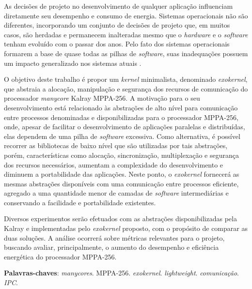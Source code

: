\documentclass[
  12pt,       %
  openright,      %
  twoside,      %
  a4paper,      %
  english,      %
  brazil,       %
  ]{abntex2}
\begin{document}
\begin{resumo}

    As decisões de projeto no desenvolvimento de qualquer aplicação influenciam
    diretamente seu desempenho e consumo de energia.
    Sistemas operacionais não são diferentes, incorporando um conjunto de
    decisões de projeto que, em muitos casos, são herdadas e permanecem
    inalteradas mesmo que o \textit{hardware} e o \textit{software} tenham evoluído com o
    passar dos anos.
    Pelo fato dos sistemas operacionais formarem a base de quase todas as
    pilhas de \textit{software}, suas inadequações possuem um impacto generalizado
    nos sistemas atuais \cite{hunt_singularity:_2007}. 
    
    O objetivo deste trabalho é propor um \textit{kernel} minimalista,
    denominado \textit{exokernel}, que abstraia a alocação, manipulação e
    segurança dos recursos de comunicação do processador \textit{manycore} 
    Kalray MPPA-256.
    A motivação para o seu desenvolvimento está relacionado às abstrações
    de alto nível para comunicação entre processos denominadas \ipc e disponibilizadas
    para o processador MPPA-256, onde, apesar de facilitar o desenvolvimento
    de aplicações paralelas e distribuídas, elas dependem de uma pilha de
    \textit{software} excessiva.
    Como alternativa, é possível recorrer as bibliotecas de baixo nível que
    são utilizadas por tais abstrações, porém, características como alocação,
    sincronização, multiplexação e segurança dos recursos necessários,
    aumentam a complexidade do desenvolvimento e diminuem a portabilidade das
    aplicações.
    Neste ponto, o \textit{exokernel} fornecerá as mesmas abstrações \ipc
    disponíveis com uma comunicação entre processos eficiente, agregado a
    uma quantidade menor de camadas de \textit{software} intermediárias e conservando
    a facilidade e portabilidade existentes.
    
    Diversos experimentos serão efetuados com as abstrações disponibilizadas
    pela Kalray e implementadas pelo \textit{exokernel} proposto, com o propósito
    de comparar as duas soluções.
    A análise ocorrerá sobre métricas relevantes para o projeto, buscando
    avaliar, principalmente, o aumento do desempenho e eficiência energética
    do processador MPPA-256.

 \vspace{\onelineskip}
    
 \noindent
 \textbf{Palavras-chaves}: \textit{manycores}. MPPA-256. \textit{exokernel}. \textit{lightweight}. \textit{comunicação}. \textit{IPC}.
\end{resumo}
\end{document}
